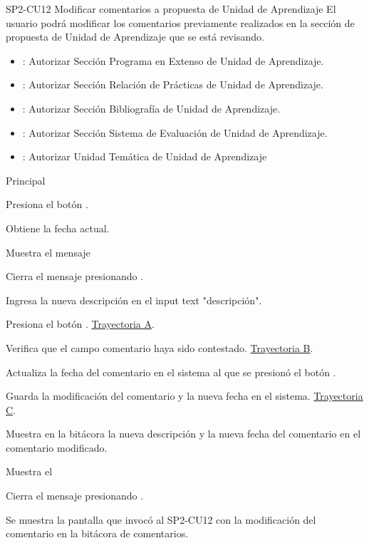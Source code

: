 \begin{UseCase}{SP2-CU12}{ Modificar comentarios a propuesta de Unidad de Aprendizaje }{El usuario podrá modificar los comentarios previamente realizados en la sección de propuesta de Unidad de Aprendizaje que se está revisando.}
{\begin{itemize}
            \item {}: Autorizar Sección Programa en Extenso de Unidad de Aprendizaje.

            \item {}: Autorizar Sección Relación de Prácticas de Unidad de Aprendizaje.
            \item {}: Autorizar Sección Bibliografía de Unidad de Aprendizaje.
            \item {}: Autorizar Sección Sistema de Evaluación de Unidad de Aprendizaje.
            \item {}: Autorizar Unidad Temática de Unidad de Aprendizaje

        \end{itemize}
        }
\end{UseCase}

\begin{UCtrayectoria}{Principal}


    \UCpaso[\UCactor] Presiona el botón . 
    
    \UCpaso Obtiene la fecha actual. 
    
    \UCpaso Muestra el mensaje 

    \UCpaso[\UCactor] Cierra el mensaje presionando .
    
    \UCpaso[\UCactor] Ingresa la nueva descripción en el input text "descripción".
    
    \UCpaso[\UCactor] Presiona el botón . \hyperlink{SP2-CU12-A}{Trayectoria A}.
    
    \UCpaso Verifica que el campo comentario haya sido contestado. \hyperlink{SP2-CU12-B}{Trayectoria B}.

    \UCpaso Actualiza la fecha del comentario en el sistema al que se presionó el botón .

    \UCpaso Guarda la modificación del comentario y la nueva fecha en el sistema. \hyperlink{SP2-CU12-C}{Trayectoria C}.

    \UCpaso Muestra en la bitácora la nueva descripción y la nueva fecha del comentario en el comentario modificado.

    \UCpaso Muestra el  

    \UCpaso[\UCactor] Cierra el mensaje presionando .

    \UCpaso Se muestra la pantalla que invocó al SP2-CU12 con la modificación del comentario en la bitácora de comentarios. 

\end{UCtrayectoria}

